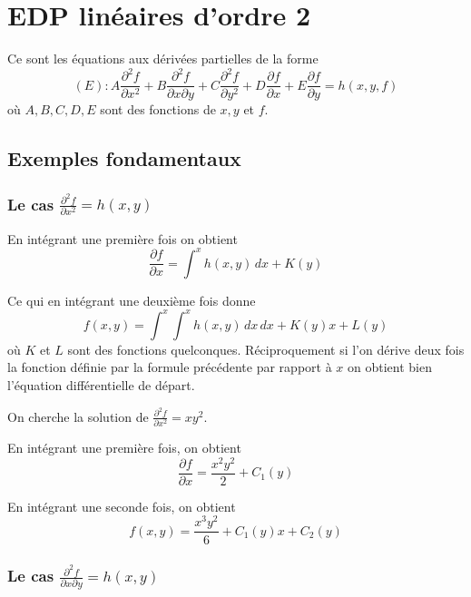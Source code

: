 \documentclass[12pt]{article}
\newcounter{definition}
\newcounter{exercice}
\begin{document}
\section{EDP linéaires d'ordre 2}

\begin{definition}
Ce sont les équations aux dérivées partielles de la forme
$$
(E): A \frac{\partial^{2} f}{\partial x^{2}} + B \frac{\partial^{2} f}{\partial x \partial y} + C \frac{\partial^{2} f}{\partial y^{2}} + D \frac{\partial f}{\partial x} + E \frac{\partial f}{\partial y} = h(x, y, f)
$$
où $A, B, C, D, E$ sont des fonctions de $x, y$ et $f$.
\end{definition}

\subsection{Exemples fondamentaux}

\subsubsection{Le cas $\frac{\partial^{2} f}{\partial x^{2}} = h(x, y)$}

En intégrant une première fois on obtient
$$
\frac{\partial f}{\partial x} = \int^{x} h(x, y)\, dx + K(y)
$$

Ce qui en intégrant une deuxième fois donne
$$
f(x, y) = \int^{x} \int^{x} h(x, y)\, dx\, dx + K(y) x + L(y)
$$
où $K$ et $L$ sont des fonctions quelconques. Réciproquement si l'on dérive deux fois la fonction définie par la formule précédente par rapport à $x$ on obtient bien l'équation différentielle de départ.

\begin{exercice}
On cherche la solution de $\frac{\partial^{2} f}{\partial x^{2}} = xy^{2}$.
\end{exercice}

\begin{corrige}
En intégrant une première fois, on obtient
$$
\frac{\partial f}{\partial x} = \frac{x^{2} y^{2}}{2} + C_{1}(y)
$$

En intégrant une seconde fois, on obtient
$$
f(x, y) = \frac{x^{3} y^{2}}{6} + C_{1}(y) x + C_{2}(y)
$$
\end{corrige}

\subsubsection{Le cas $\frac{\partial^{2} f}{\partial x \partial y} = h(x, y)$}
\end{document}

